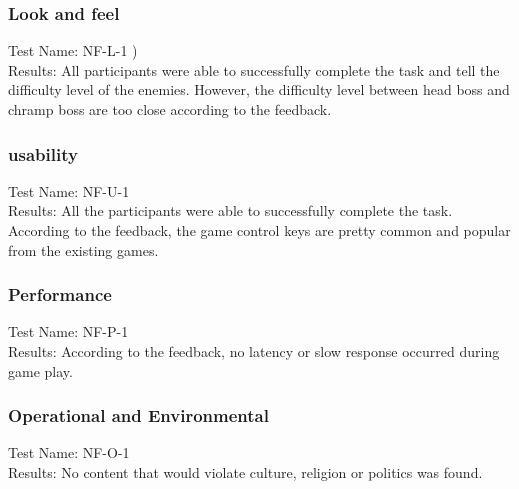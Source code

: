 \documentclass[12,english]{article}
\begin{document}
	\subsubsection{Look and feel}
	Test Name: NF-L-1 )\\
	Results: All participants were able to successfully complete the task and tell the difficulty level of the enemies. However, the difficulty level between head boss and chramp boss are too close according to the feedback. 
	\subsubsection{usability}
	
	Test Name: NF-U-1\\
	Results: All the participants were able to successfully complete the task. According to the feedback, the game control keys are pretty common and popular from the existing games.

	\subsubsection{Performance}
	Test Name: NF-P-1 \\
	Results: According to the feedback, no latency or slow response occurred during game play.
	
	\subsubsection{Operational and Environmental}

	Test Name: NF-O-1 \\
	Results: No content that would violate  culture, religion or politics was found.\\
	
\end{document}
